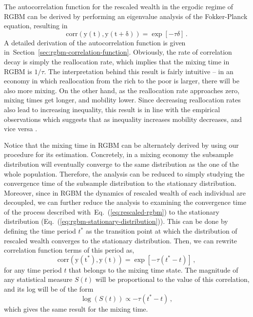 \documentclass[11pt]{article}
\newcommand{\eref}[1]{Eq.~(\ref{eq:#1})}
\newcommand{\Sref}[1]{Section~\ref{sec:#1}}
\newcommand{\be}{\begin{equation}}
\newcommand{\ee}{\end{equation}}
\numberwithin{equation}{section}
\begin{document}
The autocorrelation function for the rescaled wealth in the ergodic regime of RGBM can be derived by performing an eigenvalue analysis of the Fokker-Planck equation, resulting in
%
\be
\mathrm{corr(y(t), y(t+\delta))} = \exp\left[ -\tau \delta \right]\,.
\label{eq:rgbm-correlation}
\ee
%
A detailed derivation of the autocorrelation function is given in~\Sref{rgbm-correlation-function}. Obviously, the rate of correlation decay is simply the reallocation rate, which implies that the mixing time in RGBM is $1/\tau$. The interpretation behind this result is fairly intuitive -- in an economy in which reallocation from the rich to the poor is larger, there will be also more mixing. On the other hand, as the reallocation rate approaches zero, mixing times get longer, and mobility lower. Since decreasing reallocation rates also lead to increasing inequality, this result is in line with the empirical observations which suggests that as inequality increases mobility decreases, and vice versa \citep{corak2013}.

Notice that the mixing time in RGBM can be alternately derived by using our procedure for its estimation. Concretely, in a mixing economy the subsample distribution will eventually converge to the same distribution as the one of the whole population. Therefore, the analysis can be reduced to simply studying the convergence time of the subsample distribution to the stationary distribution. Moreover, since in RGBM the dynamics of rescaled wealth of each individual are decoupled, we can further reduce the analysis to examining the convergence time of the process described with~\eref{rescaled-rgbm} to the stationary distribution (\eref{rgbm-stationary-distribution}). This can be done by defining the time period $t^*$ as the transition point at which the distribution of rescaled wealth converges to the stationary distribution. Then, we can rewrite correlation function terms of this period as,
%
\be
    \mathrm{corr(y(t^*), y(t))} = \exp\left[ -\tau (t^* -t)\right]\,,
\ee
%
for any time period $t$ that belongs to the mixing time state. The magnitude of any statistical measure $S(t)$ will be proportional to the value of this correlation, and its log will be of the form
%
\be
    \log (S(t)) \propto  - \tau (t^*-t)\,,
\ee
%
which gives the same result for the mixing time.
\end{document}

